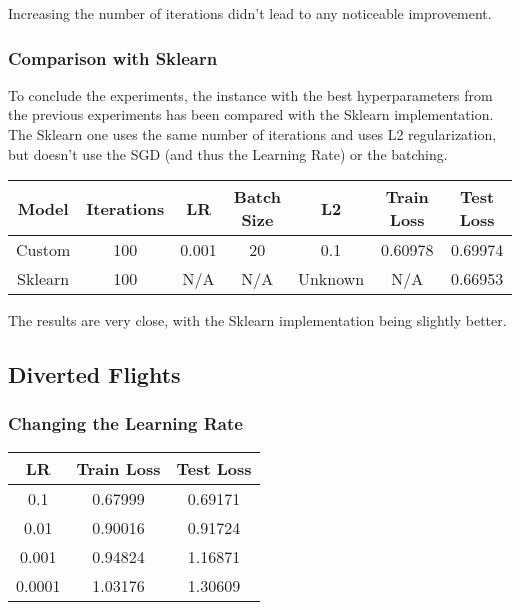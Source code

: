 \documentclass[
	letterpaper, %
	10pt, %
]{class}
\begin{document}
Increasing the number of iterations didn't lead to any noticeable improvement.

\subsubsection{Comparison with Sklearn}

To conclude the experiments, the instance with the best hyperparameters from the previous experiments has been compared with the Sklearn implementation.\\

The Sklearn one uses the same number of iterations and uses L2 regularization, but doesn't use the SGD (and thus the Learning Rate) or the batching.

\begin{center}
	\begin{tabular}{ |c|c|c|c|c|c|c| }
		\hline
		Model   & Iterations & LR    & Batch Size & L2      & Train Loss & Test Loss \\
		\hline
		Custom  & 100        & 0.001 & 20         & 0.1     & 0.60978    & 0.69974   \\
		Sklearn & 100        & N/A   & N/A        & Unknown & N/A        & 0.66953   \\
		\hline
	\end{tabular}
\end{center}

The results are very close, with the Sklearn implementation being slightly better.

\subsection{Diverted Flights}

\subsubsection{Changing the Learning Rate}

\begin{center}
	\begin{tabular}{ |c|c|c| }
		\hline
		LR     & Train Loss & Test Loss \\
		\hline
		0.1    & 0.67999    & 0.69171   \\
		0.01   & 0.90016    & 0.91724   \\
		0.001  & 0.94824    & 1.16871   \\
		0.0001 & 1.03176    & 1.30609   \\
		\hline
	\end{tabular}
\end{center}
\end{document}
